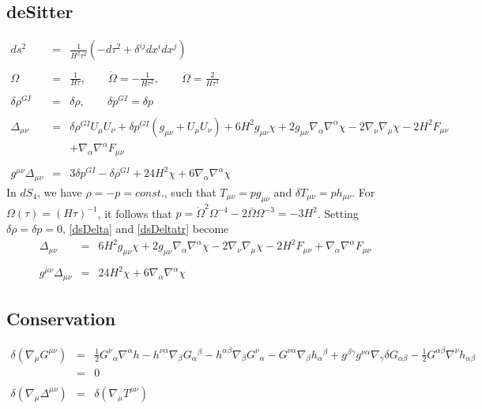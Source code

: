 \documentclass[10pt,letterpaper]{article}
\numberwithin{equation}{section}
\begin{document}
\subsection{deSitter}
%
\begin{eqnarray}
ds^2 &=& \frac{1}{H^2\tau^2}\left(-d\tau^2 + \delta^{ij}dx^idx^j\right)
\\ \nonumber\\
\Omega &=& \frac{1}{H\tau},\qquad \dot\Omega = -\frac{1}{H\tau^2},\qquad \ddot \Omega =\frac{2}{H\tau^3}
\\ \nonumber\\
\delta \rho^{GI} &=& \delta \rho,\qquad \delta p^{GI} = \delta p
\\ \nonumber\\
\Delta_{\mu\nu}&=& \delta \rho^{GI}{} U_{\mu } U_{\nu } + \delta p^{GI}{} (g_{\mu \nu } + U_{\mu } U_{\nu }) + 6 H^2 g_{\mu \nu } \chi + 2 g_{\mu \nu } \nabla_{\alpha }\nabla^{\alpha }\chi - 2 \nabla_{\nu }\nabla_{\mu }\chi -2 H^2 F_{\mu \nu } \nonumber \\ 
&& + \nabla_{\alpha }\nabla^{\alpha }F_{\mu \nu }
\label{dsDelta}
\\  \nonumber\\ 
g^{\mu\nu}\Delta_{\mu\nu}&=& 3 \delta p^{GI}{} -  \delta \rho^{GI}{} + 24 H^2 \chi + 6 \nabla_{\alpha }\nabla^{\alpha }\chi 
\label{dsDeltatr}
\end{eqnarray}
In $dS_4$, we have $\rho=-p=const.$, such that $T_{\mu\nu} = p g_{\mu\nu}$ and $\delta T_{\mu\nu} = ph_{\mu\nu}$. For $\Omega(\tau) = (H\tau)^{-1}$, it follows that $p=\dot{\Omega}^2 \Omega^{-4} - 2 \overset{..}{\Omega} \Omega^{-3}=-3H^2$. Setting $\delta \rho = \delta p = 0$, \eqref{dsDelta} and \eqref{dsDeltatr} become
\begin{eqnarray}
\Delta_{\mu\nu}&=& 6 H^2 g_{\mu \nu } \chi + 2 g_{\mu \nu } \nabla_{\alpha }\nabla^{\alpha }\chi - 2 \nabla_{\nu }\nabla_{\mu }\chi -2 H^2 F_{\mu \nu } + \nabla_{\alpha }\nabla^{\alpha }F_{\mu \nu }
\\  \nonumber\\ 
g^{\mu\nu}\Delta_{\mu\nu}&=& 24 H^2 \chi + 6 \nabla_{\alpha }\nabla^{\alpha }\chi 
\end{eqnarray}
%
%
\subsection{Conservation}
%
\begin{eqnarray}
\delta(\nabla_\mu G^{\mu\nu})&=& \tfrac{1}{2} G^{\nu }{}_{\alpha } \nabla^{\alpha }h -  h^{\nu \alpha } \nabla_{\beta }G_{\alpha }{}^{\beta } -  h^{\alpha \beta } \nabla_{\beta }G^{\nu }{}_{\alpha } -  G^{\nu \alpha } \nabla_{\beta }h_{\alpha }{}^{\beta } + g^{\beta \gamma } g^{\nu \alpha } \nabla_{\gamma }\delta G_{\alpha \beta } -  \tfrac{1}{2} G^{\alpha \beta } \nabla^{\nu }h_{\alpha \beta }
\nonumber\\
&=&0
\\ \nonumber\\
\delta(\nabla_\mu \Delta^{\mu\nu}) &=& \delta(\nabla_\mu T^{\mu\nu})
\end{eqnarray}
\end{document}
